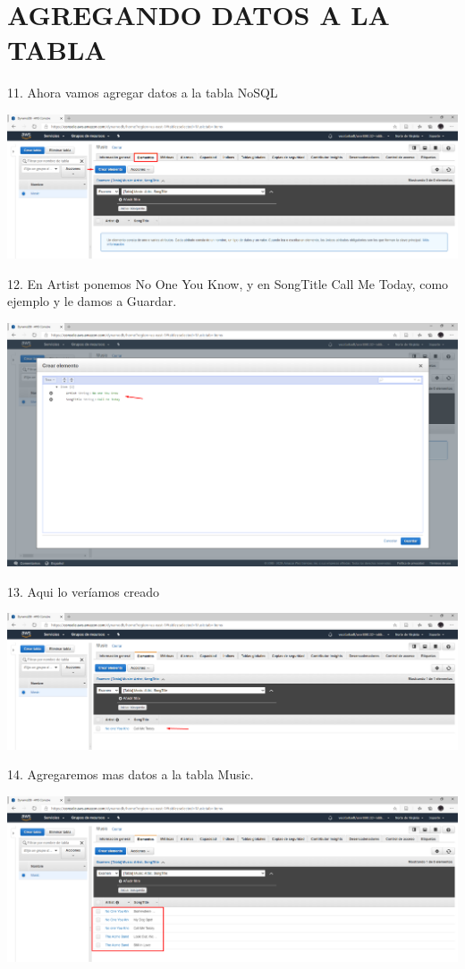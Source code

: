\documentclass[12pt,letterpaper]{article}
\begin{document}
\section{AGREGANDO DATOS A LA TABLA}
11.	Ahora vamos agregar datos a la tabla NoSQL
\begin{center}
    \includegraphics[width=15cm]{img/11.png}  
\end{center}


12.	En Artist ponemos No One You Know, y en SongTitle Call Me Today, como ejemplo y le damos a Guardar.
\begin{center}
    \includegraphics[width=15cm]{img/12.png}  
\end{center}


13.	Aqui lo veríamos creado
\begin{center}
    \includegraphics[width=15cm]{img/13.png}  
\end{center}
\newpage


14.	Agregaremos mas datos a la tabla Music.
\begin{center}
    \includegraphics[width=15cm]{img/14.png}  
\end{center}
\newpage
\end{document}
